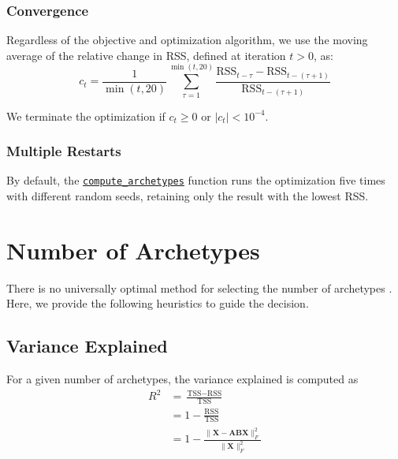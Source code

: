 \documentclass{article}
\begin{document}
\subsubsection{Convergence}

Regardless of the objective and optimization algorithm, we use the moving average of the relative change in RSS, defined at iteration $t > 0$, as:
\begin{equation}
    c_t = \frac{1}{\min(t, 20)} \sum_{\tau = 1}^{\min(t, 20)} \frac{\text{RSS}_{t-\tau} - \text{RSS}_{t-(\tau+1)}}{\text{RSS}_{t-(\tau+1)}}
\end{equation}

We terminate the optimization if $c_t \geq 0$ or $|c_t| < 10^{-4}$.

\subsubsection{Multiple Restarts}

By default, the \href{https://github.com/saezlab/ParTIpy/blob/f0e2c9df82ba9ef18322ac9d97c085c14019bdf7/partipy/paretoti.py#L556-L716}{\texttt{compute\_archetypes}} function runs the optimization five times with different random seeds, retaining only the result with the lowest RSS.



\section{Number of Archetypes}

There is no universally optimal method for selecting the number of archetypes \autocite{alcacerSurveyArchetypalAnalysis2025}. Here, we provide the following heuristics to guide the decision.

\subsection{Variance Explained}

For a given number of archetypes, the variance explained is computed as
\begin{equation}
    \begin{aligned}
        R^2
        &= \frac{\text{TSS} - \text{RSS}}{\text{TSS}} \\
        &= 1 - \frac{\text{RSS}}{\text{TSS}} \\
        &= 1 - \frac{\| \mathbf{X} - \mathbf{A} \mathbf{B} \mathbf{X} \|_F^2}{\| \mathbf{X} \|_F^2}
    \end{aligned}
\end{equation}
\end{document}
